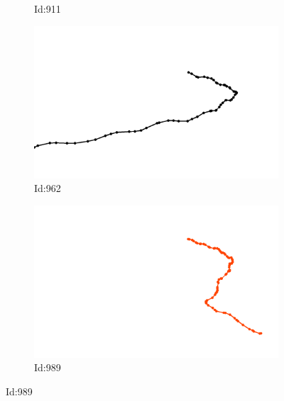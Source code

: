 \documentclass[12pt,twoside]{report}
\begin{document}
\begin{figure}
\begin{subfigure}[b]{0.20\textwidth}
\caption{Id:911}
\end{subfigure}
\begin{subfigure}[b]{0.20\textwidth}
\centering
\includegraphics[width=\textwidth]{../trajectories/962.png}
\caption{Id:962}
\end{subfigure}
\begin{subfigure}[b]{0.20\textwidth}
\centering
\includegraphics[width=\textwidth]{../trajectories/989.png}
\caption{Id:989}
\end{subfigure}
\end{figure}
\end{document}
